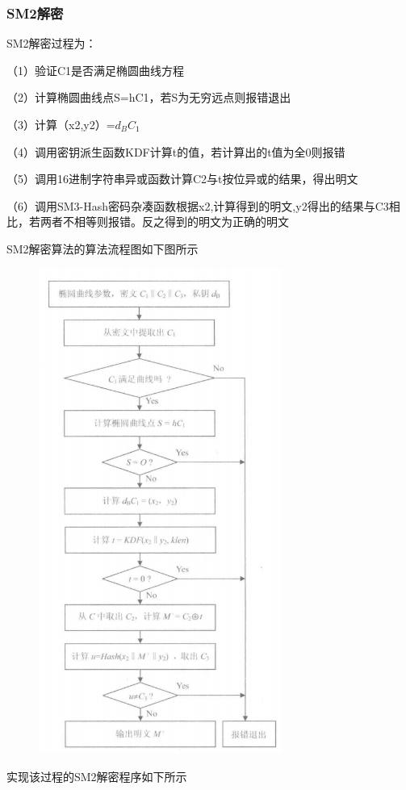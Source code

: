 \documentclass[a4paper,11pt,UTF8]{ctexart}
\newcommand{\bottomcaption}{%
\setlength{\abovecaptionskip}{6pt}%
\setlength{\belowcaptionskip}{6pt}%
\caption}
\newcommand{\xiaowuhao}{\fontsize{9pt}{\baselineskip}\selectfont}   %
\begin{document}
        \subsubsection{SM2解密}
            SM2解密过程为：\par
            （1）验证C1是否满足椭圆曲线方程\par
            （2）计算椭圆曲线点S=hC1，若S为无穷远点则报错退出\par
            （3）计算（x2,y2）=$d_{B}C_{1}$\par
            （4）调用密钥派生函数KDF计算t的值，若计算出的t值为全0则报错\par
            （5）调用16进制字符串异或函数计算C2与t按位异或的结果，得出明文\par
            （6）调用SM3-Hash密码杂凑函数根据x2,计算得到的明文,y2得出的结果与C3相比，若两者不相等则报错。反之得到的明文为正确的明文\par
            SM2解密算法的算法流程图如下图所示
            \begin{figure}[H]
                \centering
                \includegraphics[width=8cm]{SM2解密流程.png}
                \bottomcaption{\xiaowuhao{SM2解密流程}}
            \end{figure}
            实现该过程的SM2解密程序如下所示
            
\end{document}

